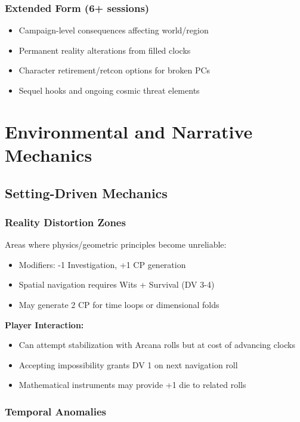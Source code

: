 \documentclass[11pt]{article}
\begin{document}
\subsubsection{Extended Form (6+ sessions)}

\begin{itemize}
\item Campaign-level consequences affecting world/region
\item Permanent reality alterations from filled clocks
\item Character retirement/retcon options for broken PCs
\item Sequel hooks and ongoing cosmic threat elements
\end{itemize}

\section{Environmental and Narrative Mechanics}

\subsection{Setting-Driven Mechanics}

\subsubsection{Reality Distortion Zones}

Areas where physics/geometric principles become unreliable:
\begin{itemize}
\item Modifiers: -1 Investigation, +1 CP generation
\item Spatial navigation requires Wits + Survival (DV 3-4)
\item May generate 2 CP for time loops or dimensional folds
\end{itemize}

\textbf{Player Interaction:}
\begin{itemize}
\item Can attempt stabilization with Arcana rolls but at cost of advancing clocks
\item Accepting impossibility grants DV 1 on next navigation roll
\item Mathematical instruments may provide +1 die to related rolls
\end{itemize}

\subsubsection{Temporal Anomalies}
\end{document}

